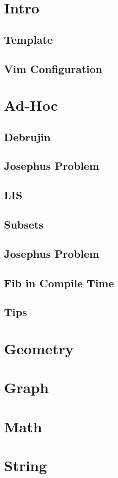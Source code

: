 \documentclass[a4paper,12pt]{article}
\newcommand\addS[4]{
  \subsection{#2}
  
}
\begin{document}
\tableofcontents
\thispagestyle{fancy}
\newpage

\begin{multicols}{2}

\section{Intro}
\addS{c++}{Template}{config}{template.cpp}
\addS{c++}{Vim Configuration}{config}{vimrc.cpp}

\section{Ad-Hoc}
\addS{c++}{Debrujin}{ad-hoc}{debruijn.cpp}
\addS{c++}{Josephus Problem}{ad-hoc}{josephus.cpp}
\addS{c++}{LIS}{ad-hoc}{lis.cpp}
\addS{c++}{Subsets}{ad-hoc}{subsets.cpp}
\addS{c++}{Josephus Problem}{ad-hoc}{subsets.cpp}
\addS{c++}{Fib in Compile Time}{ad-hoc}{compile_time_fib.cpp}
\addS{c++}{Tips}{ad-hoc}{tips.cpp}

\section{Geometry}

\section{Graph}

\section{Math}

\section{String}

\end{multicols}
\end{document}
